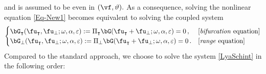 \documentclass[a4paper,reqno,10pt]{article}
\begin{document}
and is assumed to be even in $(\vf,\vartheta).$ 
 As a consequence, solving the
nonlinear equation \eqref{Eq-New1}  becomes equivalent to solving the coupled system
\begin{equation}
\begin{cases}\label{LyaSchint}
	\bG_{\intercal}(\fu_{\intercal},\fu_{\perp};\omega,\alpha,\varepsilon)
	:=
	\Pi_{\intercal}\bG(\fu_{\intercal}+\fu_{\perp};\omega,\alpha,\varepsilon)
	=0\,, & \textnormal{[\textit{bifurcation} equation]}  \\
	\bG_{\perp}(\fu_{\intercal},\fu_{\perp};\omega,\alpha,\varepsilon)
	:=
	\Pi_{\perp}\bG(\fu_{\intercal}+\fu_{\perp};\omega,\alpha,\varepsilon)
	=0\,. & \textnormal{[\textit{range} equation]} 
\end{cases}
\end{equation}
Compared to the standard approach, we choose to solve the system \eqref{LyaSchint} in the following order:
\end{document}
